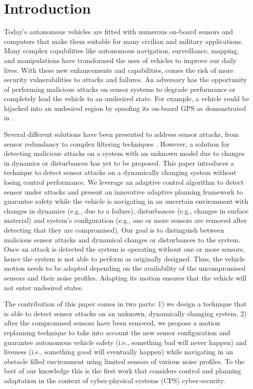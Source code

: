 
\section{Introduction} \label{sec:introduction}

Today's autonomous vehicles are fitted with numerous on-board sensors and computers that make them suitable for many civilian and military applications. Many complex capabilities like autonomous navigation, surveillance, mapping, and manipulations have transformed the uses of vehicles to improve our daily lives. 
With these new enhancements and capabilities, comes the risk of more security vulnerabilities to attacks and failures. An adversary has the opportunity of performing malicious attacks on sensor systems to degrade performance or completely lead the vehicle to an undesired state. For example, a vehicle could be hijacked into an undesired region by spoofing its on-board GPS as demonstrated in \cite{lee}.

Several different solutions have been presented to address sensor attacks, from sensor redundancy to complex filtering techniques \cite{fawzi2014secure,6120187,6943080,7330811}. However, a solution for detecting malicious attacks on a system with an unknown model due to changes in dynamics or disturbances has yet to be proposed. This paper introduces a technique to detect sensor attacks on a dynamically changing system without losing control performance. We leverage an adaptive control algorithm to detect sensor under attacks and present an innovative adaptive planning framework to guarantee safety while the vehicle is navigating in an uncertain environment with changes in dynamics (e.g., due to a failure), disturbances (e.g., changes in surface material) and system's configuration (e.g., one or more sensors are removed after detecting that they are compromised). 
Our goal is to distinguish between malicious sensor attacks and dynamical changes or disturbances to the system. Once an attack is detected the system is operating without one or more sensors, hence the system is not able to perform as originally designed.  Thus, the vehicle motion needs to be adapted depending on the availability of the uncompromised sensors and their noise profiles. Adapting its motion ensures that the vehicle will not enter undesired states. 

The contribution of this paper comes in two parts: 1) we design a technique that is able to detect sensor attacks on an unknown, dynamically changing system, 2) after the compromised sensors have been removed, we propose a motion replanning technique to take into account the new sensor configuration and  guarantee autonomous vehicle safety (i.e., something bad will never happen) and liveness (i.e., something good will eventually happen) while navigating in an obstacle filled environment using limited sensors of various noise profiles. 
To the best of our knowledge this is the first work that considers control and planning adaptation in the context of cyber-physical systems (CPS) cyber-security.



